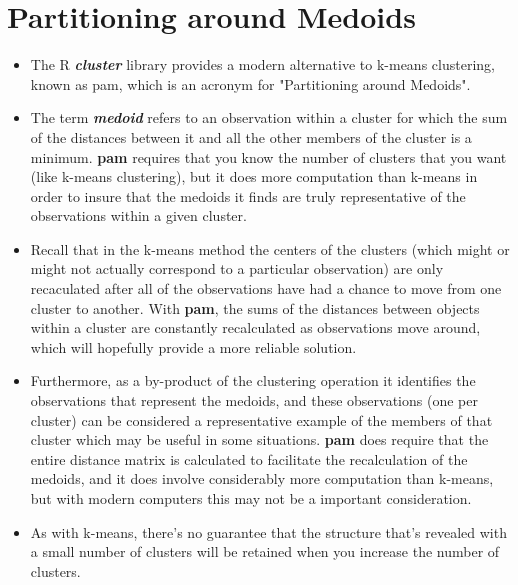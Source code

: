 \documentclass[SKLCluster.tex]{subfiles}
\begin{document}
\section{Partitioning around Medoids}
\begin{itemize}
\item The R \textbf{\textit{cluster}} library provides a modern alternative to k-means clustering, known as pam, which is an acronym for "Partitioning around Medoids". 

\item The term\textbf{ \textit{medoid}} refers to an observation within a cluster for which the sum of the distances between it and all the other members of the cluster is a minimum. \textbf{pam} requires that you know the number of clusters that you want (like k-means clustering), but it does more computation than k-means in order to insure that the medoids it finds are truly representative of the observations within a given cluster. 

\item  Recall that in the k-means method the centers of the clusters (which might or might not actually correspond to a particular observation) are only recaculated after all of the observations have had a chance to move from one cluster to another. With \textbf{pam}, the sums of the distances between objects within a cluster are constantly recalculated as observations move around, which will hopefully provide a more reliable solution. 
\item Furthermore, as a by-product of the clustering operation it identifies the observations that represent the medoids, and these observations (one per cluster) can be considered a representative example of the members of that cluster which may be useful in some situations. \textbf{pam} does require that the entire distance matrix is calculated to facilitate the recalculation of the medoids, and it does involve considerably more computation than k-means, but with modern computers this may not be a important consideration. 
\item As with k-means, there's no guarantee that the structure that's revealed with a small number of clusters will be retained when you increase the number of clusters.
\end{itemize}
\end{document}
